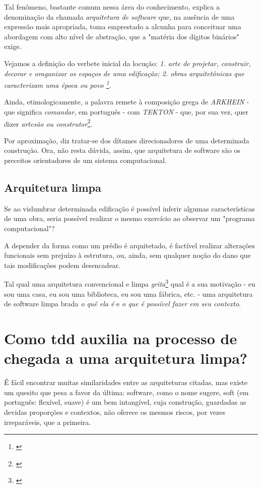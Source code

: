     Tal fenômeno, bastante comum nessa área do conhecimento, explica a denominação da chamada \emph{arquitetura de software} que, na ausência de uma expressão mais apropriada, toma emprestado a alcunha para conceituar uma abordagem com alto nível de abstração, que a "matéria dos dígitos binários" exige.

    Vejamos a definição do verbete inicial da locução: \emph{1. arte de projetar, construir, decorar e oraganizar os espaços de uma edificação; 2. obras arquitetônicas que caracterizam uma época ou povo \footnote{\cite[p. 81]{Kury2007}}}.

    Ainda, etimologicamente, a palavra remete à composição grega de \emph{   ARKHEIN} - que significa \emph{comandar}, em português - com \emph{TEKTON} - que, por sua vez, quer dizer \emph{artesão ou construtor}\footnote{\cite{ Etimologia2019}}.

    Por aproximação, diz tratar-se dos dítames direcionadores de uma determinada construção. Ora, não resta dúvida, assim, que arquitetura de software são os preceitos orientadores de um sistema computacional.

    \subsection{Arquitetura limpa}

      Se ao vislumbrar determinada edificação é possível inferir algumas características de uma obra, seria possível realizar o mesmo exercício ao observar um "programa computacional"?

      A depender da forma como um prédio é arquitetado, é factível realizar alterações funcionais sem prejuízo à estrutura, ou, ainda, sem qualquer noção do dano que tais modificações podem desencadear.

      Tal qual uma arquitetura convencional e limpa \emph{grita}\footnote{\cite[p. 196]{ Martin2018}} qual é a sua motivação - eu sou uma casa, eu sou uma biblioteca, eu sou uma fábrica, etc. - uma arquitetura de software limpa brada \emph{o quê ela é} e \emph{o que é possível fazer em seu contexto}.

  \section{Como tdd auxilia na processo de chegada a uma arquitetura limpa?}

    É fácil encontrar muitas similaridades entre as arquiteturas citadas, mas existe um quesito que pesa a favor da última: software, como o nome sugere, soft (em português: flexível, suave) é um bem intangível, cuja construção, guardadas as devidas proporções e contextos, não oferece os mesmos riscos, por vezes irreparáveis, que a primeira.

